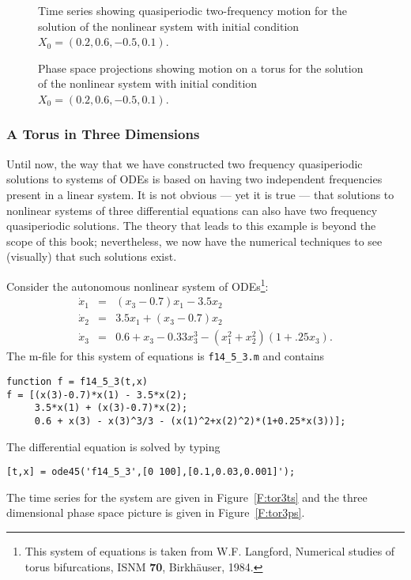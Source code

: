 \documentclass{ximera}
\begin{document}
\begin{figure}[htb]
   \centerline{%
   }
   \caption{Time series showing quasiperiodic two-frequency motion for the 
	solution of the nonlinear system \protect{} with 
	initial condition $X_0=(0.2,0.6,-0.5,0.1)$.}
   \label{F:tornlts}
\end{figure}

\begin{figure}[htb]
   \centerline{%
   }
   \caption{Phase space projections showing motion on a torus for the 
	solution of the nonlinear system \protect{} with 
	initial condition $X_0=(0.2,0.6,-0.5,0.1)$.}
   \label{F:tornlps}
\end{figure}



\subsubsection*{A Torus in Three Dimensions}

Until now, the way that we have constructed two frequency quasiperiodic 
solutions to systems of ODEs is based on having two independent frequencies 
present in a linear system.  It is not obvious --- yet it is true --- 
that solutions to nonlinear systems of three differential equations 
can also have two frequency quasiperiodic 
solutions.  The theory that 
leads to this example is beyond the scope of this book; nevertheless, we
now have the numerical techniques to see (visually) that such solutions 
exist.

Consider the autonomous nonlinear system of ODEs\footnote{This system of
equations is taken from W.F. Langford, Numerical studies of torus bifurcations, 
ISNM {\bf 70}, Birkh\"auser, 1984.}:
\begin{equation*}  \label{e:ftor3}
\begin{array}{rcl}
\dot{x}_1 & = & (x_3-0.7)x_1 - 3.5x_2\\
\dot{x}_2 & = &  3.5x_1 + (x_3-0.7)x_2 \\
\dot{x}_3 & = & 0.6 + x_3 - 0.33x_3^3 - (x_1^2+x_2^2)(1+.25x_3).
\end{array}
\end{equation*}
The m-file for this system of equations is 
{\tt f14\_5\_3.m} and contains
\begin{verbatim}
function f = f14_5_3(t,x)
f = [(x(3)-0.7)*x(1) - 3.5*x(2); 
     3.5*x(1) + (x(3)-0.7)*x(2); 
     0.6 + x(3) - x(3)^3/3 - (x(1)^2+x(2)^2)*(1+0.25*x(3))];
\end{verbatim}
The differential equation  is solved by typing
\begin{verbatim}
[t,x] = ode45('f14_5_3',[0 100],[0.1,0.03,0.001]');
\end{verbatim}
The time series for the system  are given in 
Figure~\ref{F:tor3ts} and the three dimensional phase space
 picture is given in Figure~\ref{F:tor3ps}.
\end{document}
